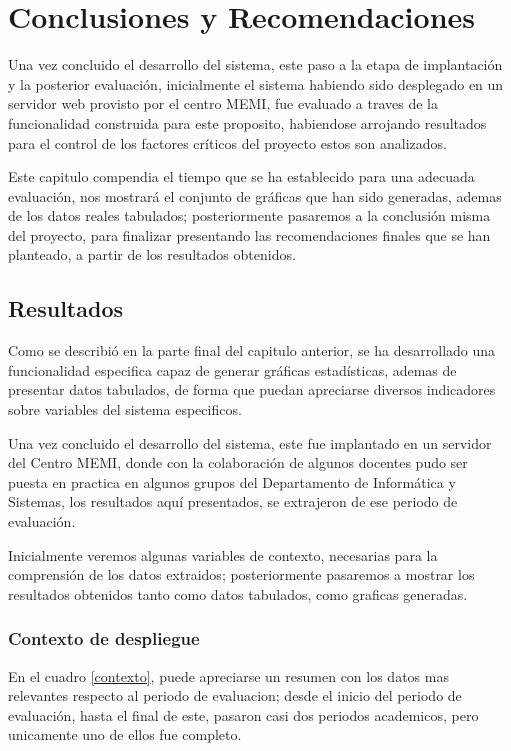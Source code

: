 \chapter{Conclusiones y Recomendaciones}

Una vez concluido el desarrollo del sistema, este paso a la etapa de
implantación y la posterior evaluación, inicialmente el sistema habiendo sido
desplegado en un servidor web provisto por el centro MEMI, fue evaluado a traves
de la funcionalidad construida para este proposito, habiendose arrojando
resultados para el control de los factores críticos del proyecto estos son
analizados.

Este capitulo compendia el tiempo que se ha establecido para una adecuada
evaluación, nos mostrará el conjunto de gráficas que han sido generadas, ademas
de los datos reales tabulados; posteriormente pasaremos a la conclusión misma
del proyecto, para finalizar presentando las recomendaciones finales que se han
planteado, a partir de los resultados obtenidos.

\section{Resultados}
Como se describió en la parte final del capitulo anterior, se ha desarrollado
una funcionalidad especifica capaz de generar gráficas estadísticas, ademas de
presentar datos tabulados, de forma que puedan apreciarse diversos indicadores
sobre variables del sistema especificos.

Una vez concluido el desarrollo del sistema, este fue implantado en un servidor
del Centro MEMI, donde con la colaboración de algunos docentes pudo ser puesta
en practica en algunos grupos del Departamento de Informática y Sistemas, los
resultados aquí presentados, se extrajeron de ese periodo  de evaluación.

Inicialmente veremos algunas variables de contexto, necesarias para la
comprensión de los datos extraidos; posteriormente pasaremos a mostrar los
resultados obtenidos tanto como datos tabulados, como graficas generadas.

\subsection{Contexto de despliegue}
En el cuadro \ref{contexto}, puede apreciarse un resumen con los datos mas
relevantes respecto al periodo de evaluacion; desde el inicio del periodo de
evaluación, hasta el final de este, pasaron casi dos periodos academicos, pero
unicamente uno de ellos fue completo.

